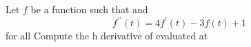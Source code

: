 Let $f$ be a function such that   and \[f^{\prime\prime}(t)=4f^\prime(t)-3f(t)+1\] for all   Compute the h derivative of  evaluated at 